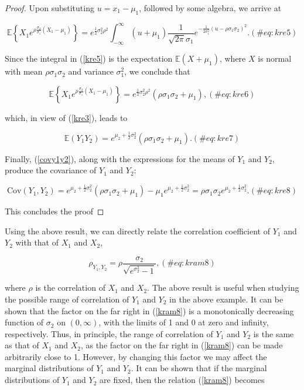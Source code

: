 \documentclass[
]{jss}
\begin{document}
\begin{proof}
Upon substituting $u=x_1-\mu_1$, followed by some algebra, we arrive at 

\begin{equation}
\mathbb E \left\{ X_1 e^{ \rho\frac{\sigma_2}{\sigma_1} (X_1-\mu_1)} \right\} = e^{\frac{1}{2}\sigma_2^2\rho^2} \int_{-\infty}^\infty (u+\mu_1)  \frac{1}{\sqrt{2\pi}\sigma_1} e^{-\frac{1}{2\sigma_1^2}(u-\rho\sigma_1\sigma_2)^2}.
(\#eq:kre5)
\end{equation}

Since the integral in (\ref{kre5}) is the expectation $\mathbb E(X+\mu_1)$, where $X$ is normal with mean $\rho\sigma_1\sigma_2$ and variance $\sigma_1^2$, we conclude that 

\begin{equation}
\mathbb E \left\{ X_1 e^{ \rho\frac{\sigma_2}{\sigma_1} (X_1-\mu_1)} \right\} = e^{\frac{1}{2}\sigma_2^2\rho^2} (\rho\sigma_1\sigma_2 +\mu_1),
(\#eq:kre6)
\end{equation}

which, in view of (\ref{kre3}), leads to 

\begin{equation}
\mathbb E (Y_1Y_2) = e^{\mu_2 + \frac{1}{2}\sigma_2^2} (\rho\sigma_1\sigma_2 +\mu_1).
(\#eq:kre7)
\end{equation}

Finally, (\ref{covy1y2}), along with the expressions for the means of $Y_1$ and $Y_2$, produce the covariance of $Y_1$ and $Y_2$:

\begin{equation}
\mbox{Cov}(Y_1, Y_2) = e^{\mu_2 + \frac{1}{2}\sigma_2^2} (\rho\sigma_1\sigma_2 +\mu_1) - \mu_1 e^{\mu_2 + \frac{1}{2}\sigma_2^2} = \rho\sigma_1\sigma_2 e^{\mu_2 + \frac{1}{2}\sigma_2^2}.
(\#eq:kre8)
\end{equation}

This concludes the proof
\end{proof}

Using the above result, we can directly relate the correlation
coefficient of \(Y_1\) and \(Y_2\) with that of \(X_1\) and \(X_2\),

\begin{equation}
\rho_{Y_1, Y_2} = \rho \frac{\sigma_2}{\sqrt{e^{\sigma_2^2} -1}},
(\#eq:kram8)
\end{equation}

where \(\rho\) is the correlation of \(X_1\) and \(X_2\). The above
result is useful when studying the possible range of correlation of
\(Y_1\) and \(Y_2\) in the above example. It can be shown that the
factor on the far right in (\ref{kram8}) is a monotonically decreasing
function of \(\sigma_2\) on \((0,\infty)\), with the limits of 1 and 0
at zero and infinity, respectively. Thus, in principle, the range of
correlation of \(Y_1\) and \(Y_2\) is the same as that of \(X_1\) and
\(X_2\), as the factor on the far right in (\ref{kram8}) can be made
arbitrarily close to 1. However, by changing this factor we may affect
the marginal distributions of \(Y_1\) and \(Y_2\). It can be shown that
if the marginal distributions of \(Y_1\) and \(Y_2\) are fixed, then the
relation (\ref{kram8}) becomes
\end{document}
